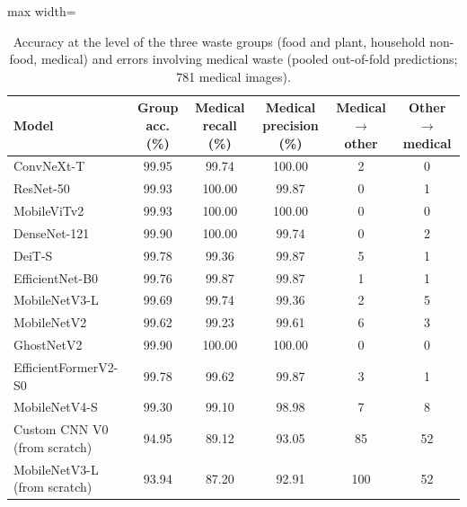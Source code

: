 \begin{table}[!htbp]
\centering
\footnotesize
\caption{Accuracy at the level of the three waste groups (food and plant, household non-food, medical) and errors involving medical waste (pooled out-of-fold predictions; 781 medical images).}
\label{tab:medical}
\begin{adjustbox}{max width=\textwidth}
\begin{tabular}{@{}lccccc@{}}
\toprule
Model & Group acc. (\%) & Medical recall (\%) & Medical precision (\%) & Medical $\rightarrow$ other & Other $\rightarrow$ medical \\
\midrule
ConvNeXt-T & 99.95 & 99.74 & 100.00 & 2 & 0 \\
ResNet-50 & 99.93 & 100.00 & 99.87 & 0 & 1 \\
MobileViTv2 & 99.93 & 100.00 & 100.00 & 0 & 0 \\
DenseNet-121 & 99.90 & 100.00 & 99.74 & 0 & 2 \\
DeiT-S & 99.78 & 99.36 & 99.87 & 5 & 1 \\
EfficientNet-B0 & 99.76 & 99.87 & 99.87 & 1 & 1 \\
MobileNetV3-L & 99.69 & 99.74 & 99.36 & 2 & 5 \\
MobileNetV2 & 99.62 & 99.23 & 99.61 & 6 & 3 \\
GhostNetV2 & 99.90 & 100.00 & 100.00 & 0 & 0 \\
EfficientFormerV2-S0 & 99.78 & 99.62 & 99.87 & 3 & 1 \\
MobileNetV4-S & 99.30 & 99.10 & 98.98 & 7 & 8 \\
\midrule
Custom CNN V0 (from scratch) & 94.95 & 89.12 & 93.05 & 85 & 52 \\
MobileNetV3-L (from scratch) & 93.94 & 87.20 & 92.91 & 100 & 52 \\
\bottomrule
\end{tabular}
\end{adjustbox}
\end{table}
